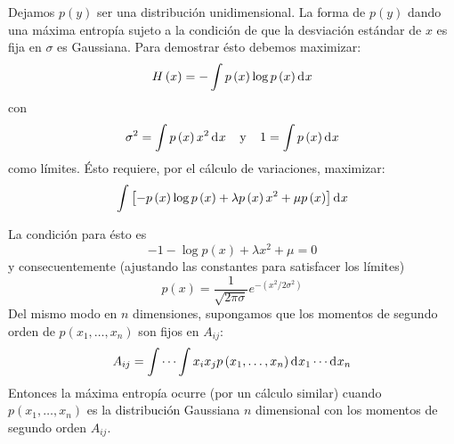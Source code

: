 \item{Dejamos $p\left ( y \right )$ ser una distribuci\'on unidimensional. La forma de $p\left ( y \right )$ dando una m\'axima entrop\'ia sujeto a la condici\'on de que la desviaci\'on est\'andar de $x$ es fija en $\sigma $ es Gaussiana. Para demostrar \'esto debemos maximizar:
\begin{equation}
H\left ( x \right )=-\int p\left ( x \right )\log p\left ( x \right ) \diff x 
\end{equation}
con
\begin{equation}
\sigma^{2}=\int p\left ( x \right )x^{2} \diff x  \:\:\:\:\: \textup{y} \:\:\:\:\: 1=\int p\left ( x \right ) \diff x 
\end{equation}
como l\'imites. \'Esto requiere, por el c\'alculo de variaciones, maximizar:
\begin{equation}
\int \left [ -p\left ( x \right ) \log p\left ( x \right ) + \lambda p\left ( x \right ) x^{2} + \mu p\left ( x \right )\right ] \diff x 
\end{equation}

La condici\'on para \'esto es
\begin{equation}
-1-\log p\left ( x \right )+\lambda x^{2}+\mu =0
\end{equation}
y consecuentemente (ajustando las constantes para satisfacer los l\'imites)
\begin{equation}
p\left ( x \right )=\frac{1}{\sqrt{2\pi \sigma }}e^{-\left ( x^{2}/2\sigma ^{2} \right )}
\end{equation}
Del mismo modo en $n$ dimensiones, supongamos que los momentos de
segundo orden de $p\left ( x_{1}, \ldots ,x_{n} \right )$ son fijos en
$A_{ij}$:
\begin{equation}
A_{ij}=\int \cdots \int x_{i}x_{j}p\left ( x_{1}, \ldots ,x_{n} \right ) \diff x _{1}\cdots  \diff x_{n}
\end{equation}
Entonces la m\'axima entrop\'ia ocurre (por un c\'alculo similar)
cuando $p\left ( x_{1}, \ldots ,x_{n} \right )$ es la distribuci\'on
Gaussiana $n$ dimensional con los momentos de segundo orden $A_{ij}$.}

